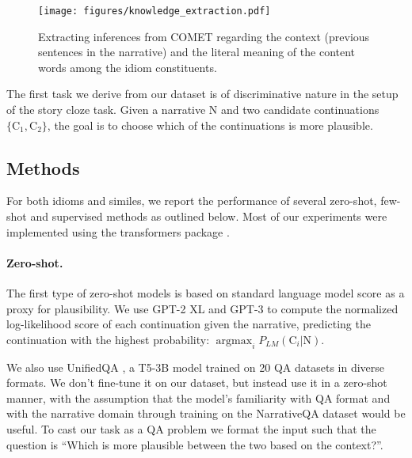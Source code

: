 \begin{figure*}[t]
    \centering
    \texttt{[image: figures/knowledge\_extraction.pdf]} 
    \caption{Extracting inferences from COMET regarding the context (previous sentences in the narrative) and the literal meaning of the content words among the idiom constituents.}
    \label{fig:knowledge_extraction}
\end{figure*}


The first task we derive from our dataset is of discriminative nature in the setup of the story cloze task. Given a narrative N and two candidate continuations $\{\text{C}_1, \text{C}_2\}$, the goal is to choose which of the continuations is more plausible. 

\subsection{Methods}
\label{sec:disc:methods}

For both idioms and similes, we report the performance of several zero-shot, few-shot and supervised methods as outlined below. Most of our experiments were implemented using the transformers package \cite{wolf-etal-2020-transformers}. 


\paragraph{Zero-shot.} The first type of zero-shot models is based on standard language model score as a proxy for plausibility. We use GPT-2 XL \cite{Radford2019LanguageMA} and GPT-3 \cite{brown2020language} to compute the normalized log-likelihood score of each continuation given the narrative, predicting the continuation with the highest probability: $ \operatorname{argmax}_i P_{LM}(\text{C}_i |\text{N})$. 




We also use UnifiedQA \cite{khashabi-etal-2020-unifiedqa}, a T5-3B model \cite{raffel2020exploring} trained on 20 QA datasets in diverse formats. We don't fine-tune it on our dataset, but instead use it in a zero-shot manner, with the assumption that the model's familiarity with QA format and with the narrative domain through training on the NarrativeQA dataset \cite{kocisky-etal-2018-narrativeqa} would be useful. To cast our task as a QA problem we format the input such that the question is ``Which is more plausible between the two based on the context?''. 


